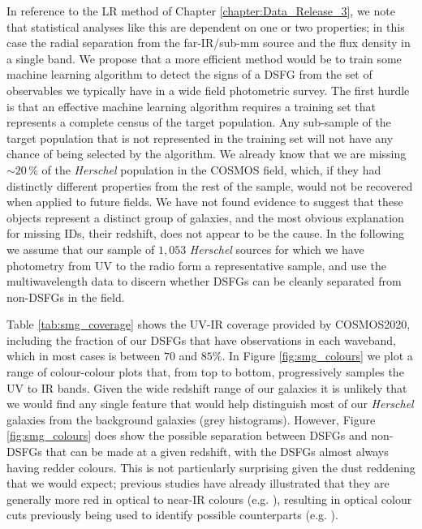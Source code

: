 In reference to the LR method of Chapter \ref{chapter:Data_Release_3}, we note that statistical analyses like this are dependent on one or two properties; in this case the radial separation from the far-IR/sub-mm source and the flux density in a single band. We propose that a more efficient method would be to train some machine learning algorithm to detect the signs of a DSFG from the set of observables we typically have in a wide field photometric survey. The first hurdle is that an effective machine learning algorithm requires a training set that represents a complete census of the target population. Any sub-sample of the target population that is not represented in the training set will not have any chance of being selected by the algorithm. We already know that we are missing $\sim20\,\%$ of the \textit{Herschel} population in the COSMOS field, which, if they had distinctly different properties from the rest of the sample, would not be recovered when applied to future fields. We have not found evidence to suggest that these objects represent a distinct group of galaxies, and the most obvious explanation for missing IDs, their redshift, does not appear to be the cause. In the following we assume that our sample of $1,053$ \textit{Herschel} sources for which we have photometry from UV to the radio form a representative sample, and use the multiwavelength data to discern whether DSFGs can be cleanly separated from non-DSFGs in the field.

Table \ref{tab:smg_coverage} shows the UV-IR coverage provided by COSMOS2020, including the fraction of our DSFGs that have observations in each waveband, which in most cases is between $70$ and $85\%$. In Figure \ref{fig:smg_colours} we plot a range of colour-colour plots that, from top to bottom, progressively samples the UV to IR bands. Given the wide redshift range of our galaxies it is unlikely that we would find any single feature that would help distinguish most of our \textit{Herschel} galaxies from the background galaxies (grey histograms). However, Figure \ref{fig:smg_colours} does show the possible separation between DSFGs and non-DSFGs that can be made at a given redshift, with the DSFGs almost always having redder colours. This is not particularly surprising given the dust reddening that we would expect; previous studies have already illustrated that they are generally more red in optical to near-IR colours (e.g. \citealt{Smail_2002, Dannerbauer_2004, Wang_2012, Chen_2016}), resulting in optical colour cuts previously being used to identify possible counterparts (e.g. \citealt{Michalowski_2012b}).

